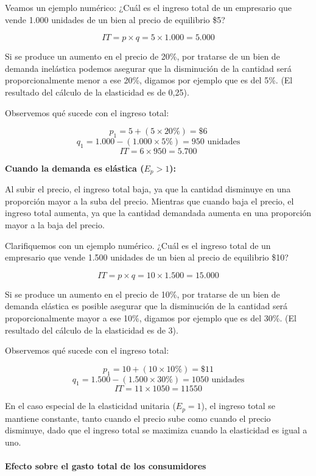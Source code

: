 \documentclass[12pt,a4paper]{article}
\begin{document}
Veamos un ejemplo numérico: ¿Cuál es el ingreso total de un empresario que vende 1.000 unidades de un bien al precio de equilibrio \$5?

\[
IT = p \times q = 5 \times 1.000 = 5.000
\]

Si se produce un aumento en el precio de 20\%, por tratarse de un bien de demanda inelástica podemos asegurar que la disminución de la cantidad será proporcionalmente menor a ese 20\%, digamos por ejemplo que es del 5\%. (El resultado del cálculo de la elasticidad es de 0,25).

Observemos qué sucede con el ingreso total:

\[
p_1 = 5 + (5 \times 20\%) = \$6
\]
\[
q_1 = 1.000 - (1.000 \times 5\%) = 950 \text{ unidades}
\]
\[
IT = 6 \times 950 = 5.700
\]

\textbf{Cuando la demanda es elástica ($E_p > 1$):}

Al subir el precio, el ingreso total baja, ya que la cantidad disminuye en una proporción mayor a la suba del precio. Mientras que cuando baja el precio, el ingreso total aumenta, ya que la cantidad demandada aumenta en una proporción mayor a la baja del precio.

Clarifiquemos con un ejemplo numérico. ¿Cuál es el ingreso total de un empresario que vende 1.500 unidades de un bien al precio de equilibrio \$10?

\[
IT = p \times q = 10 \times 1.500 = 15.000
\]

Si se produce un aumento en el precio de 10\%, por tratarse de un bien de demanda elástica es posible asegurar que la disminución de la cantidad será proporcionalmente mayor a ese 10\%, digamos por ejemplo que es del 30\%. (El resultado del cálculo de la elasticidad es de 3).

Observemos qué sucede con el ingreso total:

\[
p_1 = 10 + (10 \times 10\%) = \$11
\]
\[
q_1 = 1.500 - (1.500 \times 30\%) = 1050 \text{ unidades}
\]
\[
IT = 11 \times 1050 = 11550
\]

En el caso especial de la elasticidad unitaria ($E_p = 1$), el ingreso total se mantiene constante, tanto cuando el precio sube como cuando el precio disminuye, dado que el ingreso total se maximiza cuando la elasticidad es igual a uno.

\paragraph{Efecto sobre el gasto total de los consumidores}
\end{document}

